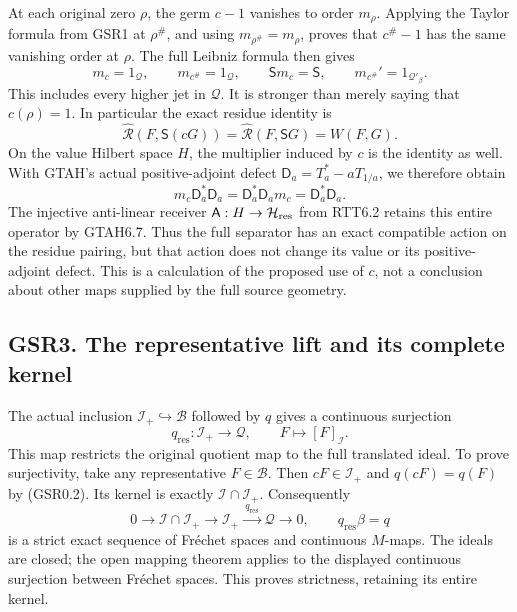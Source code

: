At each original zero \(\rho\), the germ \(c-1\) vanishes to order
\(m_\rho\). Applying the Taylor formula from GSR1 at \(\rho^\#\), and
using \(m_{\rho^\#}=m_\rho\), proves that \(c^\#-1\) has the same
vanishing order at \(\rho\). The full Leibniz formula then gives \[
m_c=1_{\mathcal Q},\qquad m_{c^\#}=1_{\mathcal Q},
\qquad
\mathsf S m_c=\mathsf S,
\qquad m_{c^\#}'=1_{\mathcal Q'_\beta}.
\tag{GSR2.1}
\] This includes every higher jet in \(\mathcal Q\). It is stronger than
merely saying that \(c(\rho)=1\). In particular the exact residue
identity is \[
\widehat{\mathcal R}(F,\mathsf S(cG))
=\widehat{\mathcal R}(F,\mathsf SG)
=W(F,G).
\tag{GSR2.2}
\] On the value Hilbert space \(H\), the multiplier induced by \(c\) is
the identity as well. With GTAH's actual positive-adjoint defect
\(\mathsf D_a=T_a^*-aT_{1/a}\), we therefore obtain \[
m_c\mathsf D_a^*\mathsf D_a
=\mathsf D_a^*\mathsf D_a m_c
=\mathsf D_a^*\mathsf D_a.
\tag{GSR2.3}
\] The injective anti-linear receiver
\(\mathsf A:H\to\mathcal H_{\rm res}\) from RTT6.2 retains this entire
operator by GTAH6.7. Thus the full separator has an exact compatible
action on the residue pairing, but that action does not change its value
or its positive-adjoint defect. This is a calculation of the proposed
use of \(c\), not a conclusion about other maps supplied by the full
source geometry.

\subsection{GSR3. The representative lift and its complete
kernel}\label{gsr3.-the-representative-lift-and-its-complete-kernel}

The actual inclusion \(\mathcal I_+\hookrightarrow\mathcal B\) followed
by \(q\) gives a continuous surjection \[
q_{\mathrm{res}}:\mathcal I_+\longrightarrow\mathcal Q,\qquad F\longmapsto[F]_{\mathcal I}.
\tag{GSR3.1}
\] This map restricts the original quotient map to the full translated
ideal. To prove surjectivity, take any representative
\(F\in\mathcal B\). Then \(cF\in\mathcal I_+\) and \(q(cF)=q(F)\) by
(GSR0.2). Its kernel is exactly \(\mathcal I\cap\mathcal I_+\).
Consequently \[
0\longrightarrow\mathcal I\cap\mathcal I_+
\longrightarrow\mathcal I_+
\xrightarrow{\ q_{\mathrm{res}}\ }\mathcal Q\longrightarrow0,
\qquad q_{\mathrm{res}}\beta=q
\tag{GSR3.2}
\] is a strict exact sequence of Fréchet spaces and continuous
\(M\)-maps. The ideals are closed; the open mapping theorem applies to
the displayed continuous surjection between Fréchet spaces. This proves
strictness, retaining its entire kernel.

